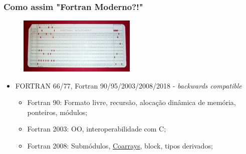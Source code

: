 \documentclass{beamer}
\begin{document}
\begin{darkframes}
  \begin{frame}[label=fortranslide]
    \frametitle{Como assim "Fortran Moderno?!"}
    \begin{figure}
      \centering
      \includegraphics[width=0.5\textwidth]{figures/FortranCardPROJ039.jpg}
    \end{figure}
    \begin{itemize}
    \item FORTRAN 66/77, Fortran 90/95/2003/2008/2018 - \emph{backwards compatible}
        \begin{itemize}
            \item Fortran 90: Formato livre, recursão, alocação dinâmica de memória, ponteiros, módulos;
            \item Fortran 2003: OO, interoperabilidade com C;
            \item Fortran 2008: Submódulos, \href{https://en.wikipedia.org/wiki/Coarray_Fortran}{Coarrays}, block, tipos derivados;
        \end{itemize}
    \end{itemize}
  \end{frame}
  

\end{darkframes}
\end{document}
